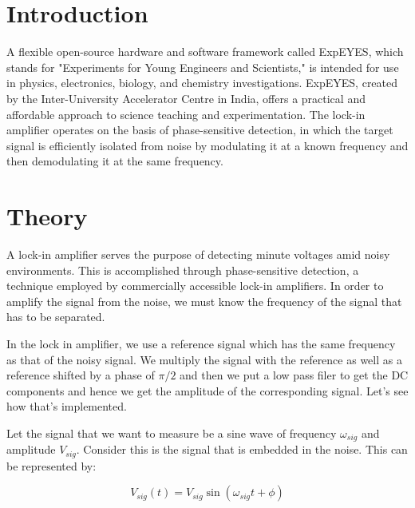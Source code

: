\documentclass{article}
\begin{document}
\begin{multicols}{2}






\section{\label{intro}Introduction}

A flexible open-source hardware and software framework called ExpEYES, which stands for "Experiments for Young Engineers and Scientists," is intended for use in physics, electronics, biology, and chemistry investigations. ExpEYES, created by the Inter-University Accelerator Centre in India, offers a practical and affordable approach to science teaching and experimentation. The lock-in amplifier operates on the basis of phase-sensitive detection, in which the target signal is efficiently isolated from noise by modulating it at a known frequency and then demodulating it at the same frequency. 


\section{\label{theory}Theory}


A lock-in amplifier serves the purpose of detecting minute voltages amid noisy environments. This is accomplished through phase-sensitive detection, a technique employed by commercially accessible lock-in amplifiers. In order to amplify the signal from the noise, we must know the frequency of the signal that has to be separated. 


In the lock in amplifier, we use a reference signal which has the same frequency as that of the noisy signal. We multiply the signal with the reference as well as a reference shifted by a phase of $\pi/2$ and then we put a low pass filer to get the DC components and hence we get the amplitude of the corresponding signal. Let's see how that's implemented.



Let the signal that we want to measure be a sine wave of frequency $\omega_{sig}$ and amplitude $V_{sig}$. Consider this is the signal that is embedded in the noise. This can be represented by:


\begin{equation}
    V_{sig}(t) = V_{sig} \sin(\omega_{sig}t + \phi)
\end{equation}


\end{multicols}
\end{document}
